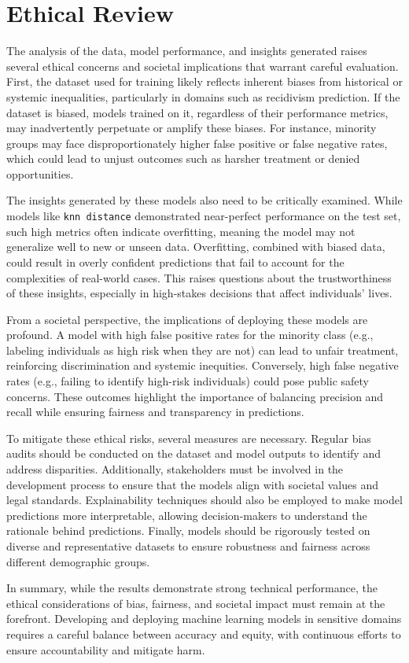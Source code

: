 \section{Ethical Review}

	The analysis of the data, model performance, and insights generated raises several ethical concerns and societal implications that warrant careful evaluation. First, the dataset used for training likely reflects inherent biases from historical or systemic inequalities, particularly in domains such as recidivism prediction. If the dataset is biased, models trained on it, regardless of their performance metrics, may inadvertently perpetuate or amplify these biases. For instance, minority groups may face disproportionately higher false positive or false negative rates, which could lead to unjust outcomes such as harsher treatment or denied opportunities.
	
	The insights generated by these models also need to be critically examined. While models like \texttt{knn distance} demonstrated near-perfect performance on the test set, such high metrics often indicate overfitting, meaning the model may not generalize well to new or unseen data. Overfitting, combined with biased data, could result in overly confident predictions that fail to account for the complexities of real-world cases. This raises questions about the trustworthiness of these insights, especially in high-stakes decisions that affect individuals' lives.
	
	From a societal perspective, the implications of deploying these models are profound. A model with high false positive rates for the minority class (e.g., labeling individuals as high risk when they are not) can lead to unfair treatment, reinforcing discrimination and systemic inequities. Conversely, high false negative rates (e.g., failing to identify high-risk individuals) could pose public safety concerns. These outcomes highlight the importance of balancing precision and recall while ensuring fairness and transparency in predictions.
	
	To mitigate these ethical risks, several measures are necessary. Regular bias audits should be conducted on the dataset and model outputs to identify and address disparities. Additionally, stakeholders must be involved in the development process to ensure that the models align with societal values and legal standards. Explainability techniques should also be employed to make model predictions more interpretable, allowing decision-makers to understand the rationale behind predictions. Finally, models should be rigorously tested on diverse and representative datasets to ensure robustness and fairness across different demographic groups.
	
	In summary, while the results demonstrate strong technical performance, the ethical considerations of bias, fairness, and societal impact must remain at the forefront. Developing and deploying machine learning models in sensitive domains requires a careful balance between accuracy and equity, with continuous efforts to ensure accountability and mitigate harm.
	




